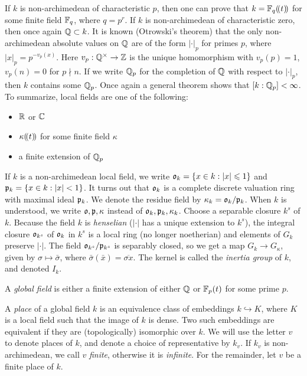 \documentclass{article}
\begin{document}
If $k$ is non-archimedean of characteristic $p$, then one can prove that 
$k=\mathbb{F}_q(\!({t})\!)$ for some finite field $\mathbb{F}_q$, where $q=p^r$. If $k$ is 
non-archimedean of characteristic zero, then once again $\mathbb{Q}\subset k$. It is 
known (Otrowski's theorem) that the only non-archimedean absolute values on 
$\mathbb{Q}$ are of the form $|\cdot|_p$ for primes $p$, where $|x|_p=p^{-v_p(x)}$. 
Here $v_p:\mathbb{Q}^\times \to \mathbb{Z}$ is the unique homomorphism with 
$v_p(p)=1$, $v_p(n)=0$ for $p\nmid n$. If we write $\mathbb{Q}_p$ for the completion 
of $\mathbb{Q}$ with respect to $|\cdot|_p$, then $k$ contains some $\mathbb{Q}_p$. Once 
again a general theorem shows that $[k:\mathbb{Q}_p]<\infty$. To summarize, local 
fields are one of the following:
\begin{itemize}
  \item $\mathbb{R}$ or $\mathbb{C}$
  \item $\kappa(\!({t})\!)$ for some finite field $\kappa$
  \item a finite extension of $\mathbb{Q}_p$
\end{itemize}

If $k$ is a non-archimedean local field, we write 
$\mathfrak{o}_k=\{x\in k:|x|\leqslant 1\}$ and $\mathfrak{p}_k = \{x\in k:|x|<1\}$. It turns 
out that $\mathfrak{o}_k$ is a complete discrete valuation ring with maximal ideal 
$\mathfrak{p}_k$. We denote the residue field by $\kappa_k=\mathfrak{o}_k/\mathfrak{p}_k$. When $k$ is 
understood, we write $\mathfrak{o},\mathfrak{p},\kappa$ instead of $\mathfrak{o}_k,\mathfrak{p}_k,\kappa_k$. 
Choose a separable closure $k^s$ of $k$. Because the field $k$ is 
\emph{henselian} ($|\cdot|$ has a unique extension to $k^s$), the integral 
closure $\mathfrak{o}_{k^s}$ of $\mathfrak{o}_k$ in $k^s$ is a local ring (no longer noetherian) 
and elements of $G_k$ preserve $|\cdot|$. The field 
$\mathfrak{o}_{k^s}/\mathfrak{p}_{k^s}$ is separably closed, so we get a map 
$G_k\to G_\kappa$, given by $\sigma\mapsto \bar\sigma$, where 
$\bar\sigma(\bar x)=\overline{\sigma x}$. The kernel is called the 
\emph{inertia group} of $k$, and denoted $I_k$. 

\begin{definition}
A \emph{global field} is either a finite extension of either $\mathbb{Q}$ or 
$\mathbb{F}_p(t)$ for some prime $p$. 
\end{definition}
A \emph{place} of a global 
field $k$ is an equivalence class of embeddings $k\hookrightarrow K$, where 
$K$ is a local field such that the image of $k$ is dense. Two such 
embeddings are equivalent if they are (topologically) isomorphic over $k$. 
We will use the letter $v$ to denote places of $k$, and denote a choice of 
representative by $k_v$. If $k_v$ is non-archimedean, we call $v$ 
\emph{finite}, otherwise it is \emph{infinite}. For the remainder, let $v$ be 
a finite place of $k$. 
\end{document}
